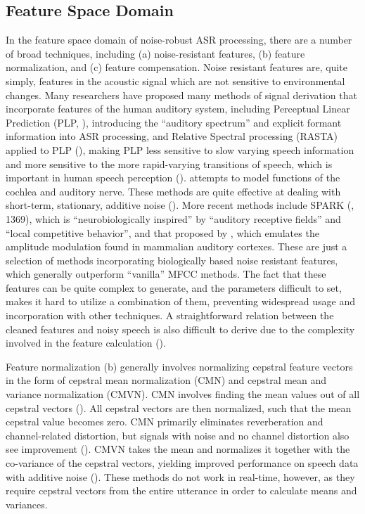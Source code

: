 \documentclass[dissertation,copyright]{uathesis}
\begin{document}
\subsection{Feature Space Domain}

In the feature space domain of noise-robust ASR processing, there are a number of broad techniques, including (a) noise-resistant features, (b) feature normalization, and  (c) feature compensation.  Noise resistant features are, quite simply, features in the acoustic signal which are not sensitive to environmental changes.  Many researchers have proposed many methods of signal derivation that incorporate features of the human auditory system, including Perceptual Linear Prediction (PLP, \cite{hermansky:85}), introducing the ``auditory spectrum'' and explicit formant information into ASR processing, and Relative Spectral processing (RASTA) applied to PLP (\cite{hermansky:92}), making PLP less sensitive to slow varying speech information and more sensitive to the more rapid-varying transitions of speech, which is important in human speech perception (\cite{willi:17}).  \cite{kim:99} attempts to model functions of the cochlea and auditory nerve. These methods are quite effective at dealing with short-term, stationary, additive noise (\cite{zhang:17}).  More recent methods include SPARK (\cite{fazel:12}, 1369), which is ``neurobiologically inspired'' by ``auditory receptive fields'' and ``local competitive behavior'', and that proposed by \cite{moritz:15}, which emulates the amplitude modulation found in mammalian auditory cortexes.  These are just a selection of methods incorporating biologically based noise resistant features, which generally outperform ``vanilla'' MFCC methods. The fact that these features can be quite complex to generate, and the parameters difficult to set, makes it hard to utilize a combination of them, preventing widespread usage and incorporation with other techniques.  A straightforward relation between the cleaned features and noisy speech is also difficult to derive due to the complexity involved in the feature calculation (\cite{li:14}).

Feature normalization (b) generally involves normalizing cepstral feature vectors in the form of cepstral mean normalization (CMN) and cepstral mean and variance normalization (CMVN).  CMN involves finding the mean values out of all cepstral vectors (\cite{atal:74}).  All cepstral vectors are then normalized, such that the mean cepstral value becomes zero.  CMN primarily eliminates reverberation and channel-related distortion, but signals with noise and no channel distortion also see improvement (\cite{droppo:08}).  CMVN takes the mean and normalizes it together with the co-variance of the cepstral vectors, yielding improved performance on speech data with additive noise (\cite{viikki:98}).
These methods do not work in real-time, however, as they require cepstral vectors from the entire utterance in order to calculate means and variances.
\end{document}
